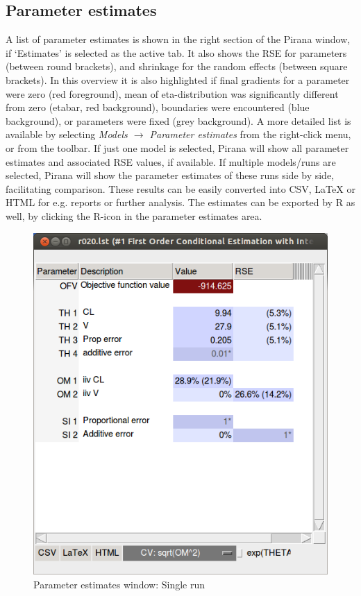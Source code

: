 {{{\subsection{Parameter estimates}
A list of parameter estimates is shown in the right section of the Pirana window, 
if `Estimates' is selected as the active tab. It also shows the RSE for parameters (between round brackets), 
and shrinkage for the random effects (between square brackets). In this overview it is also highlighted if
final gradients for a parameter were zero (red foreground), mean of eta-distribution was significantly different from zero (etabar, red background), boundaries were encountered (blue background), or parameters were fixed (grey background).
A more detailed list is available by selecting \textit{Models $\rightarrow$ Parameter estimates} from the right-click menu, or from the toolbar. If just
one model is selected, Pirana will show all parameter estimates and
associated RSE values, if available. If multiple models/runs are
selected, Pirana will show the parameter estimates of these runs side
by side, facilitating comparison. These results can be easily
converted into CSV, LaTeX or HTML for e.g. reports or further
analysis. The estimates can be exported by R as well, by clicking the
R-icon in the parameter estimates area.

\begin{figure}[H] \centering
    \includegraphics[scale=0.3]{images/estimates_window.png}
    \caption{Parameter estimates window: Single run}
\end{figure}

}}}
